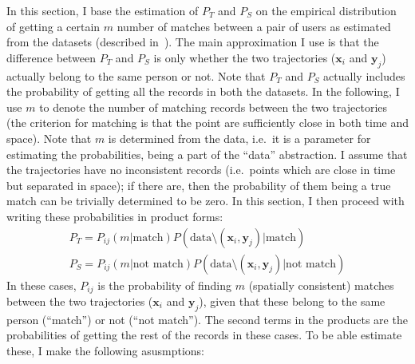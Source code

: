 \documentclass[a4paper]{article}
\renewcommand{\vec}[1]{\mathbf{#1}}
\begin{document}
		In this section, I base the estimation of $P_T$ and $P_S$ on the empirical distribution of getting a certain $m$ number of matches between a
		pair of users as estimated from the datasets (described in~\cite{matchingpaper}). The main approximation I use is that the difference between
		$P_T$ and $P_S$ is only whether the two trajectories ($\vec{x}_i$ and $\vec{y}_j$) actually belong to the same person or not. Note that $P_T$
		and $P_S$ actually includes the probability of getting all the records in both the datasets. In the following, I use $m$ to denote the number
		of matching records between the two trajectories (the criterion for matching is that the point are sufficiently close in both time and space).
		Note that $m$ is determined from the data, i.e.~it is a parameter for estimating the probabilities, being a part of the ``data'' abstraction.
		I assume that the trajectories have no inconsistent records (i.e.~points which are close in time but separated in space); if there are, then
		the probability of them being a true match can be trivially determined to be zero. In this section, I then proceed with writing these
		probabilities in product forms:
		\begin{gather}
			P_T = P_{ij}( m | \textrm{match} ) P ( \textrm{data} \setminus (\vec{x}_i, \vec{y}_j) | \textrm{match} ) \\
			P_S = P_{ij}( m | \textrm{not match} ) P ( \textrm{data} \setminus (\vec{x}_i, \vec{y}_j) | \textrm{not match} )
		\end{gather}
		In these cases, $P_{ij}$ is the probability of finding $m$ (spatially consistent) matches between the two trajectories ($\vec{x}_i$ and
		$\vec{y}_j$), given that these belong to the same person (``match'') or not (``not match''). The second terms in the products are the
		probabilities of getting the rest of the records in these cases. To be able estimate these, I make the following asusmptions:
\end{document}
